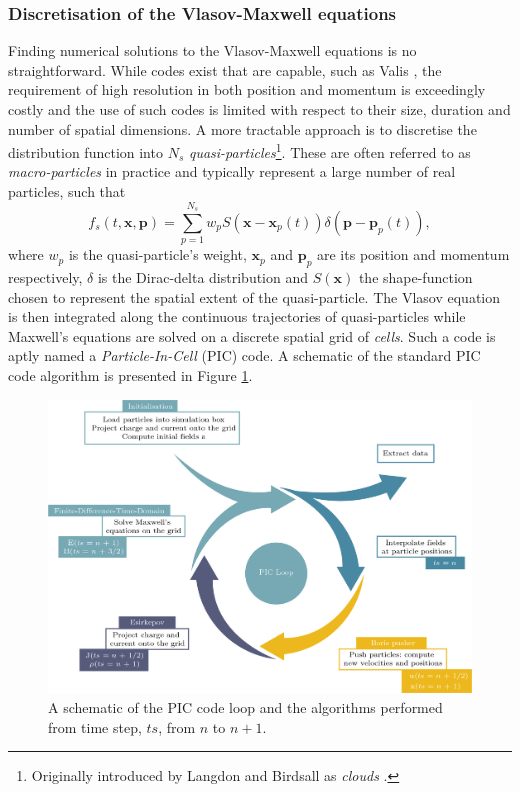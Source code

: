 \subsubsection{Discretisation of the Vlasov-Maxwell equations}
Finding numerical solutions to the Vlasov-Maxwell equations is no straightforward. While codes exist that are capable, such as Valis \cite{sircombeVALISSplitconservativeScheme2009}, the requirement of high resolution in both position and momentum is exceedingly costly and the use of such codes is limited with respect to their size, duration and number of spatial dimensions. A more tractable approach is to discretise the distribution function into $N_s$ \textit{quasi-particles}\footnote{Originally introduced by Langdon and Birdsall as \textit{clouds} \cite{langdonTheoryPlasmaSimulation1970}.}. These are often referred to as \textit{macro-particles} in practice and typically represent a large number of real particles, such that
\begin{equation}
	f_s(t,\mathbf{x},\mathbf{p}) = \sum^{N_s}_{p=1} w_p S(\mathbf{x}-\mathbf{x}_p(t))\delta (\mathbf{p}-\mathbf{p}_p(t)),
\end{equation}
where $w_p$ is the quasi-particle's weight, $\mathbf{x}_p$ and $\mathbf{p}_p$ are its position and momentum respectively, $\delta$ is the Dirac-delta distribution and $S(\mathbf{x})$ the shape-function chosen to represent the spatial extent of the quasi-particle. The Vlasov equation is then integrated along the continuous trajectories of quasi-particles while Maxwell's equations are solved on a discrete spatial grid of \textit{cells}. Such a code is aptly named a \textit{Particle-In-Cell} (PIC) code. A schematic of the standard PIC code algorithm is presented in Figure \ref{fig:intropiccycle-01}. 
\begin{figure}
	\centering
	\includegraphics[width=\linewidth]{figures/intro/intro_PIC_cycle}
	\caption[A schematic of the PIC code loop and the algorithms performed.]{A schematic of the PIC code loop and the algorithms performed from time step, $ts$, from $n$ to $n+1$.}
	\label{fig:intropiccycle-01}
\end{figure}
